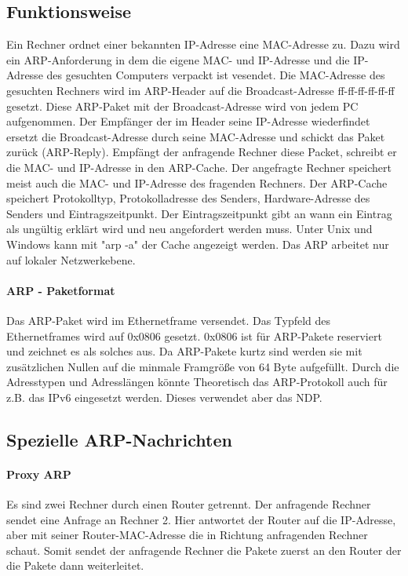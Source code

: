 \subsection{Funktionsweise}
Ein Rechner ordnet einer bekannten IP-Adresse eine MAC-Adresse zu.
Dazu wird ein ARP-Anforderung in dem die eigene MAC- und IP-Adresse und die IP-Adresse des gesuchten Computers verpackt ist vesendet. 
Die MAC-Adresse des gesuchten Rechners wird im ARP-Header auf die Broadcast-Adresse ff-ff-ff-ff-ff-ff gesetzt. 
Diese ARP-Paket mit der Broadcast-Adresse wird von jedem PC aufgenommen.
Der Empfänger der im Header seine IP-Adresse wiederfindet ersetzt die Broadcast-Adresse durch seine MAC-Adresse und schickt das Paket zurück (ARP-Reply).
Empfängt der anfragende Rechner diese Packet, schreibt er die MAC- und IP-Adresse in den ARP-Cache.
Der angefragte Rechner speichert meist auch die MAC- und IP-Adresse des fragenden Rechners.
Der ARP-Cache speichert Protokolltyp, Protokolladresse des Senders, Hardware-Adresse des Senders und Eintragszeitpunkt.
Der Eintragszeitpunkt gibt an wann ein Eintrag als ungültig erklärt wird und neu angefordert werden muss.
Unter Unix und Windows kann mit "arp -a" der Cache angezeigt werden.
Das ARP arbeitet nur auf lokaler Netzwerkebene.

\paragraph{ARP - Paketformat}
Das ARP-Paket wird im Ethernetframe versendet.
Das Typfeld des Ethernetframes wird auf 0x0806 gesetzt. 
0x0806 ist für ARP-Pakete reserviert und zeichnet es als solches aus.
Da ARP-Pakete kurtz sind werden sie mit zusätzlichen Nullen auf die minmale Framgröße von 64 Byte aufgefüllt.
Durch die Adresstypen und Adresslängen könnte Theoretisch das ARP-Protokoll auch für z.B. das IPv6 eingesetzt werden.
Dieses verwendet aber das NDP.

\subsection{Spezielle ARP-Nachrichten}

\paragraph{Proxy ARP}
Es sind zwei Rechner durch einen Router getrennt.
Der anfragende Rechner sendet eine Anfrage an Rechner 2.
Hier antwortet der Router auf die IP-Adresse, aber mit seiner Router-MAC-Adresse die in Richtung anfragenden Rechner schaut.
Somit sendet der anfragende Rechner die Pakete zuerst an den Router der die Pakete dann weiterleitet.

